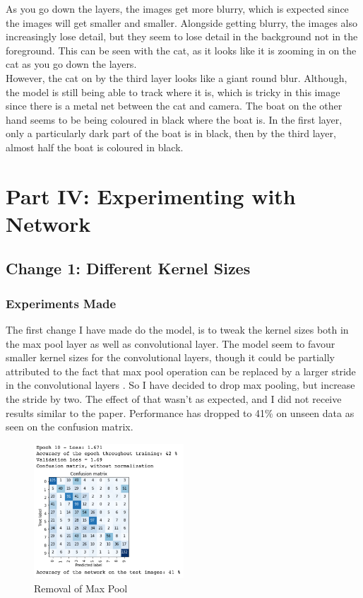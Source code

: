 \documentclass{article}
\begin{document}
    As you go down the layers, the images get more blurry, which is expected since the images will get smaller and smaller. Alongside getting blurry, the images also increasingly lose detail, but they seem to lose detail in the background not in the foreground. This can be seen with the cat, as it looks like it is zooming in on the cat as you go down the layers.\\
    
    However, the cat on by the third layer looks like a giant round blur. Although, the model is still being able to track where it is, which is tricky in this image since there is a metal net between the cat and camera. The boat on the other hand seems to be being coloured in black where the boat is. In the first layer, only a particularly dark part of the boat is in black, then by the third layer, almost half the boat is coloured in black.\\


    \section{Part IV: Experimenting with Network}


    \subsection{Change 1: Different Kernel Sizes}

    \subsubsection{Experiments Made}

    The first change I have made do the model, is to tweak the kernel sizes both in the max pool layer as well as convolutional layer. The model seem to favour smaller kernel sizes for the convolutional layers, though it could be partially attributed to the fact that max pool operation can be replaced by a larger stride in the convolutional layers \cite{maxpoolrep}. So I have decided to drop max pooling, but increase the stride by two. The effect of that wasn't as expected, and I did not receive results similar to the paper. Performance has dropped to 41\% on unseen data as seen on the confusion matrix.\\

    \begin{figure}[h!]
        \centering
        \includegraphics[width=0.5\textwidth]{first_final}
        \caption{Removal of Max Pool}
    \end{figure}
\end{document}

